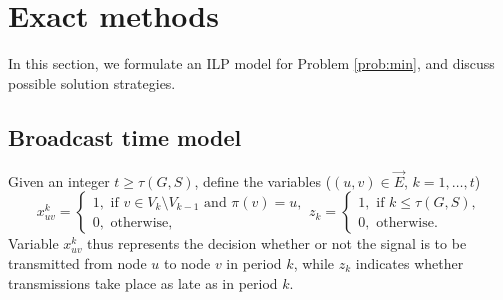 \section{Exact methods} \label{sec:exact}


In this section, we formulate an ILP model for Problem \ref{prob:min}, and discuss possible solution strategies. 

\subsection{Broadcast time model}
\label{sec:optbasic}
Given an integer $t\geq\tau(G,S)$, define the variables ($(u,v)\in \overrightarrow{E}$, $k=1,\ldots,t$) 
$$ x_{uv}^k=
\begin{cases} 
1, \text{ if } v\in V_k\setminus V_{k-1} \text{ and } \pi(v)=u,\\ 
0, \text{ otherwise},
\end{cases}
z_{k}=\begin{cases}
1, \text{ if } k\leq \tau(G,S),\\
0, \text{ otherwise}.
\end{cases}
$$
\noindent
Variable $x_{uv}^k$ thus represents the decision whether or not the signal is to be transmitted from node $u$ to node $v$ in period $k$,
while $z_k$ indicates whether transmissions take place as late as in period $k$.

